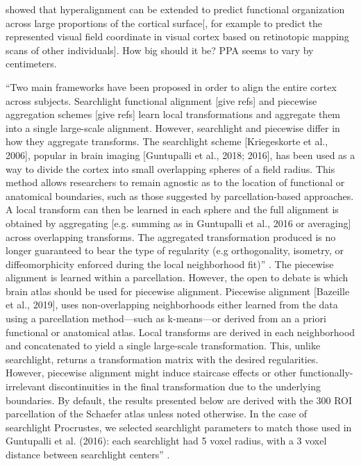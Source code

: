 

\citet{guntupalli2016model} showed that hyperalignment can be extended to
predict functional organization across large proportions of the cortical
surface[, for example to predict the represented visual field coordinate in
visual cortex based on retinotopic mapping scans of other individuals].
%
How big should it be? PPA seems to vary by centimeters.


``Two main frameworks have been proposed in order to align the entire cortex
across subjects.
%
Searchlight functional alignment [give refs] and piecewise aggregation schemes
[give refs] learn local transformations and aggregate them into a single
large-scale alignment.
%
However, searchlight and piecewise differ in how they aggregate transforms.
%
The searchlight scheme [Kriegeskorte et al., 2006], popular in brain imaging
[Guntupalli et al., 2018; 2016], has been used as a way to divide the cortex
into small overlapping spheres of a field radius.
%
This method allows researchers to remain agnostic as to the location of
functional or anatomical boundaries, such as those suggested by
parcellation-based approaches.
%
A local transform can then be learned in each sphere and the full alignment is
obtained by aggregating [e.g. summing as in Guntupalli et al., 2016 or
averaging] across overlapping transforms.
%
The aggregated transformation produced is no longer guaranteed to bear the type
of regularity (e.g orthogonality, isometry, or diffeomorphicity enforced during
the local neighborhood fit)'' \citep{bazeille2021empirical}.
%
The piecewise alignment is learned within a parcellation.
%
However, the open to debate is which brain atlas should be used for piecewise
alignment.
%
Piecewise alignment [Bazeille et al., 2019], uses non-overlapping
neighborhoods either learned from the data using a parcellation method—such as
k-means—or derived from an a priori functional or anatomical atlas.
%
Local transforms are derived in each neighborhood and concatenated to yield a
single large-scale transformation.
%
This, unlike searchlight, returns a transformation matrix with the desired
regularities.
%
However, piecewise alignment might induce staircase effects or other
functionally-irrelevant discontinuities in the final transformation due to the
underlying boundaries.
%
By default, the results presented below are derived with the 300 ROI
parcellation of the Schaefer atlas unless noted otherwise.
%
In the case of searchlight Procrustes, we selected searchlight parameters to
match those used in Guntupalli et al. (2016):
%
each searchlight had 5 voxel radius, with a 3 voxel distance between searchlight
centers'' \citep{bazeille2021empirical}.


